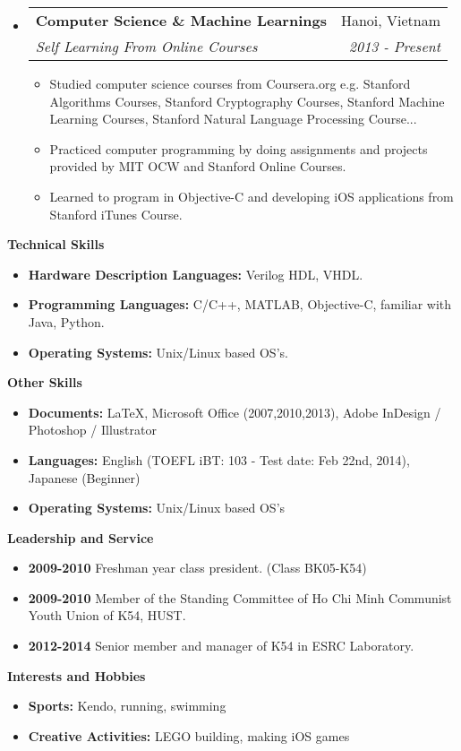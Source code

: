 \documentclass[a4paper,11pt]{article}
\makeatletter
\newcommand{\resitem}[1]{\item #1 \vspace{-2pt}}
\newcommand{\resheading}[1]{{\large \colorbox{mygrey}{\begin{minipage}{\textwidth}{\textbf{#1 \vphantom{p\^{E}}}}\end{minipage}}}}
\newcommand{\ressubheading}[4]{
\begin{tabular*}{6.5in}{l@{\extracolsep{\fill}}r}
		\textbf{#1} & #2 \\
		\textit{#3} & \textit{#4} \\
\end{tabular*}\vspace{-6pt}}
\makeatother
\begin{document}
\begin{itemize}
\item
	\ressubheading{Computer Science \& Machine Learnings}{Hanoi, Vietnam}{Self Learning From Online Courses}{2013 - Present}
	\begin{itemize}
		\resitem{Studied computer science courses from Coursera.org e.g. Stanford Algorithms Courses, Stanford Cryptography Courses, Stanford Machine Learning Courses, Stanford Natural Language Processing Course...}
		\resitem{Practiced computer programming by doing assignments and projects provided by MIT OCW and Stanford Online Courses.}
		\resitem{Learned to program in Objective-C and developing iOS applications from Stanford iTunes Course.}
	\end{itemize}
\end{itemize}

\resheading{Technical Skills}
\begin{itemize}
\item
\textbf{Hardware Description Languages:} Verilog HDL, VHDL.
\item
\textbf{Programming Languages:}  C/C++, MATLAB, Objective-C, familiar with Java, Python.
\item
\textbf{Operating Systems:} Unix/Linux based OS's.
\end{itemize}

\resheading{Other Skills}
\begin{itemize}
\item
\textbf{Documents:} \LaTeX, Microsoft Office (2007,2010,2013), Adobe InDesign / Photoshop / Illustrator
\item
\textbf{Languages:} English (TOEFL iBT: 103 - Test date: Feb 22nd, 2014), Japanese (Beginner)
\item
\textbf{Operating Systems:} Unix/Linux based OS's
\end{itemize}

\resheading{Leadership and Service}
\begin{itemize}
\item
\textbf{2009-2010} Freshman year class president. (Class BK05-K54)
\item
\textbf{2009-2010} Member of the Standing Committee of Ho Chi Minh Communist Youth Union of K54, HUST.
\item
\textbf{2012-2014} Senior member and manager of K54 in ESRC Laboratory.
\end{itemize}

\resheading{Interests and Hobbies}
\begin{itemize}
\item
\textbf{Sports:} Kendo, running, swimming
\item
\textbf{Creative Activities:} LEGO building, making iOS games
\end{itemize}
\end{document}
